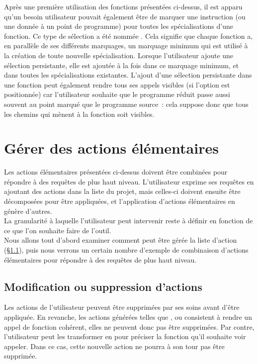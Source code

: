 Après une première utilisation des fonctions présentées ci-dessus, il est apparu
qu'un besoin utilisateur pouvait également être de marquer une instruction (ou
une donnée à un point de programme) pour toutes les spécialisations d'une
fonction. Ce type de sélection a été nommée
.
Cela signifie que chaque fonction a, en parallèle de ses différents marquages,
un marquage minimum qui est utilisé à la création de toute nouvelle
spécialisation. Lorsque l'utilisateur ajoute une sélection persistante,
elle est ajoutée à la fois dans ce marquage minimum, et dans toutes les
spécialisations existantes. L'ajout d'une sélection persistante dans une
fonction peut également rendre tous ses appels visibles (si l'option est
positionnée) car l'utilisateur souhaite que le programme réduit passe aussi
souvent au point marqué que le programme source~: cela suppose donc que tous les
chemins qui mènent à la fonction soit visibles.

\section{Gérer des actions élémentaires}\label{sec-multi-actions}

Les actions élémentaires présentées ci-dessus doivent être combinées pour
répondre à des requêtes de plus haut niveau.
L'utilisateur exprime ses requêtes en ajoutant des actions dans la liste
du projet, mais celles-ci doivent ensuite être décomposées pour être appliquées,
et l'application d'actions élémentaires en génère d'autres.\\

La granularité à laquelle l'utilisateur peut intervenir reste à
définir en fonction de ce que l'on souhaite faire de l'outil.\\

Nous allons tout d'abord examiner comment peut être gérée la liste d'action
(\S\ref{sec-gestion-actions}), puis nous verrons un certain nombre d'exemple de
combinaison d'actions élémentaires pour répondre à des requêtes de plus haut
niveau.

\subsection{Modification ou suppression d'actions}\label{sec-gestion-actions}

Les actions de l'utilisateur peuvent être supprimées par ses soins avant d'être
appliquée.  En revanche, les actions générées telles que \actChooseCall{},
\actMissingInputs{} ou \actMissingOutputs{} consistent à rendre un appel de
fonction cohérent, elles ne peuvent donc pas être supprimées. Par contre,
l'utilisateur peut les transformer en \actChangeCall{} pour préciser la fonction
qu'il souhaite voir appeler. Dans ce cas, cette nouvelle action ne pourra à son
tour pas être supprimée.

